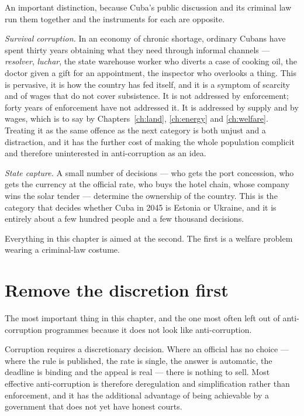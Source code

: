 An important distinction, because Cuba's public discussion and its criminal law
run them together and the instruments for each are opposite.

\emph{Survival corruption.} In an economy of chronic shortage, ordinary Cubans
have spent thirty years obtaining what they need through informal channels ---
\emph{resolver}, \emph{luchar}, the state warehouse worker who diverts a case of
cooking oil, the doctor given a gift for an appointment, the inspector who
overlooks a thing. This is pervasive, it is how the country has fed itself, and
it is a symptom of scarcity and of wages that do not cover subsistence. It is not
addressed by enforcement; forty years of enforcement have not addressed it. It is
addressed by supply and by wages, which is to say by Chapters~\ref{ch:land},
\ref{ch:energy} and \ref{ch:welfare}. Treating it as the same offence as the next
category is both unjust and a distraction, and it has the further cost of making
the whole population complicit and therefore uninterested in anti-corruption as
an idea.

\emph{State capture.} A small number of decisions \citep{hellman1998} --- who gets the port
concession, who gets the currency at the official rate, who buys the hotel chain,
whose company wins the solar tender --- determine the ownership of the country.
This is the category that decides whether Cuba in 2045 is Estonia or Ukraine, and
it is entirely about a few hundred people and a few thousand decisions.

Everything in this chapter is aimed at the second. The first is a welfare
problem wearing a criminal-law costume.

\section{Remove the discretion first}

The most important thing in this chapter, and the one most often left out of
anti-corruption programmes because it does not look like anti-corruption.

Corruption requires a discretionary decision. Where an official has no choice ---
where the rule is published, the rate is single, the answer is automatic, the
deadline is binding and the appeal is real --- there is nothing to sell. Most
effective anti-corruption is therefore deregulation and simplification rather
than enforcement, and it has the additional advantage of being achievable by a
government that does not yet have honest courts.

